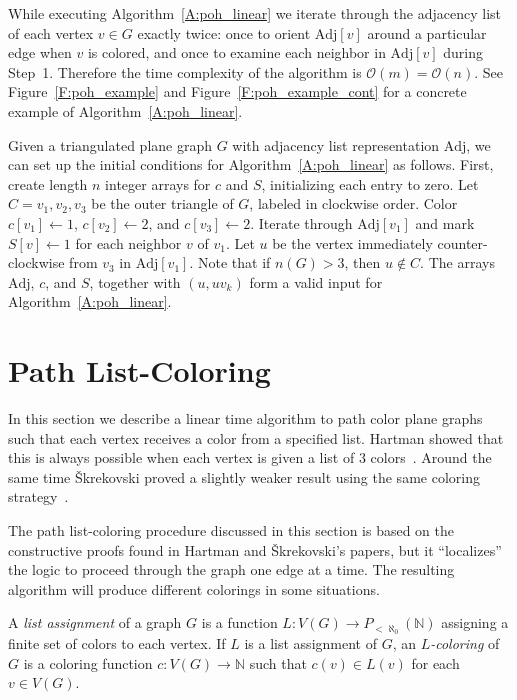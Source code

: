 \documentclass[12pt,letterpaper]{article}
\theoremstyle{plain}
\theoremstyle{definition}
\theoremstyle{break}
\newcommand{\defterm}[1]{\emph{#1}} %
\begin{document}
While executing Algorithm~\ref{A:poh_linear} we iterate through
the adjacency list of each vertex $v\in G$ exactly twice: once to
orient $\text{Adj}[v]$
around a particular edge when $v$ is colored,
and once to examine each neighbor in $\text{Adj}[v]$ during Step~1.
Therefore the time complexity of the algorithm is
$\mathcal{O}(m)=\mathcal{O}(n)$. See Figure~\ref{F:poh_example} 
and Figure~\ref{F:poh_example_cont} for a concrete example of
Algorithm~\ref{A:poh_linear}.

Given a triangulated plane graph $G$ with adjacency list representation
$\text{Adj}$, we can set up the initial conditions for
Algorithm~\ref{A:poh_linear} as follows. First, create length $n$ integer
arrays for $c$ and $S$, initializing each entry to zero.
Let $C=v_1,v_2,v_3$ be the outer triangle of $G$,
labeled in clockwise order.
Color $c[v_1]\leftarrow 1$, $c[v_2]\leftarrow 2$, and
$c[v_3]\leftarrow 2$.
Iterate through $\text{Adj}[v_1]$ and mark $S[v]\leftarrow 1$ for each
neighbor $v$ of $v_1$.
Let $u$ be the vertex immediately counter-clockwise from $v_3$ in
$\text{Adj}[v_1]$. Note that if $n(G)>3$, then $u\not\in C$.
The arrays $\text{Adj}$, $c$, and $S$, together with
$(u, uv_k)$ form a valid input for Algorithm~\ref{A:poh_linear}.

\section{Path List-Coloring}

In this section we describe a linear time algorithm to path color
plane graphs such that each vertex receives a color from a specified list.
Hartman showed that this is always possible when each vertex is given a
list of $3$ colors~\cite[Thm.~4.1]{Har1997}. Around the same
time \v{S}krekovski proved a
slightly weaker result using the same coloring
strategy~\cite[Thm.~2.2b]{Skr1999}.

The path list-coloring procedure discussed in this section is
based on the constructive proofs found in Hartman and
\v{S}krekovski's papers, but it ``localizes'' the logic to proceed through the
graph one edge at a time. The resulting algorithm
will produce different colorings in some situations.

A \defterm{list assignment} of a graph $G$ is
a function $L:V(G)\to P_{<\aleph_0}(\mathbb{N})$ assigning
a finite set of colors to each vertex. If $L$ is a list assignment of $G$,
an \defterm{$L$-coloring} of $G$ is a coloring function
$c:V(G)\to\mathbb{N}$ such that $c(v)\in L(v)$ for each $v\in V(G)$.
\end{document}
